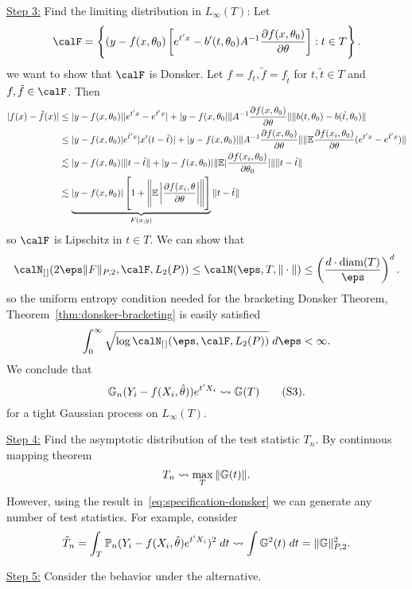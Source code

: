 \begin{example*}
	\underline{Step 3:} Find the limiting distribution in \(L_\infty(T)\): 
	Let 
	\[
		\calF = \left\{(y-f(x,\theta_0)\left[e^{t'x}-b'(t,\theta_0)A^{-1}\frac{\partial f(x,\theta_0)}{\partial \theta}\right]: t\in T\right\}
	.\] 
	we want to show that \(\calF\) is Donsker. Let \(f = f_t, \tilde f = f_{\tilde t}\) for \(t,\tilde t \in T\) and \(f,\tilde f \in\calF\). Then
	\begin{align*}
		|f(x) - \tilde f(x)| 
		&\leq |y-f(x,\theta_0)||e^{t'x}-e^{\tilde t'x}| + |y-f(x,\theta_0|\|A^{-1}\frac{\partial f(x,\theta_0)}{\partial \theta}\|	\|b(t,\theta_0)-b(\tilde t,\theta_0)\| \\
		&\leq |y-f(x,\theta_0)|e^{\bar t' x}|x'(t-\tilde t)| + |y-f(x,\theta_0)| \|A^{-1}\frac{\partial f(x,\theta_0)}{\partial \theta}\|\|\mathbb{E}\frac{\partial f(x_i,\theta_0)}{\partial \theta}(e^{t'x}-e^{\tilde t'x})\|\\
		&\lesssim |y-f(x,\theta_0)|\|t-\tilde t\| + |y-f(x,\theta_0)|\|\mathbb{E}|\frac{\partial f(x_i,\theta_0)}{\partial \theta_0}|\|\|t-\tilde t\| \\
		&\lesssim \underbrace{|y-f(x,\theta_0)|\left[1+ \left\|\mathbb{E}\left|\frac{\partial f(x_i,\theta}{\partial \theta}\right|\right\|\right]}_{F(x,y)}\|t-\tilde t\|
	\end{align*}
	so \(\calF\) is Lipschitz in \(t\in T\). We can show that 
	\[
		\calN_{[\hspace{0.1em}]}(2\eps\|F\|_{P,2},\calF,L_2(P)) \leq \calN(\eps,T,\|\cdot\|) \leq  \left(\frac{d\cdot \text{diam}(T)}{\eps}\right)^d
	.\]
	so the uniform entropy condition needed for the bracketing Donsker Theorem, Theorem~\ref{thm:donsker-bracketing} is easily satisfied 
	\[
		\int_{0}^{\infty} \sqrt{\log\calN_{[\hspace{0.1em}]}(\eps,\calF,L_2(P))}\;d\eps < \infty 
	.\] 
	We conclude that 
	\[
		\mathbb{G}_n (Y_i - f(X_i,\hat\theta))e^{t'X_i}\rightsquigarrow \mathbb{G}(T)\tag{S3}\label{eq:specification-donsker}
	.\] 
	for a tight Gaussian process on \(L_\infty(T)\).

	\underline{Step 4:} Find the asymptotic distribution of the test statistic \(T_n\). By continuous mapping theorem 
	\[
		T_n \rightsquigarrow \max_T \|\mathbb{G}(t)\|
	.\]
	However, using the result in~\eqref{eq:specification-donsker} we can generate any number of test statistics. For example, consider
	\[
		\tilde T_n = \int_T \mathbb{P}_n(Y_i-f(X_i,\hat\theta)e^{t'X_i})^2\;dt \rightsquigarrow \int \mathbb{G}^2(t)\;dt = \|\mathbb{G}\|_{P,2}^2 
	.\]

	\underline{Step 5:} Consider the behavior under the alternative.


\end{example*}
